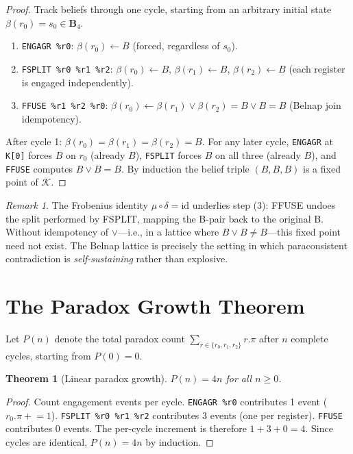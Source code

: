 \documentclass[12pt,a4paper]{article}
\newtheorem{theorem}{Theorem}
\theoremstyle{definition}
\theoremstyle{remark}
\newtheorem{remark}{Remark}
\begin{document}
\begin{proof}
Track beliefs through one cycle, starting from an arbitrary initial state
$\beta(r_0) = s_0 \in \mathbf{B}_4$.

\begin{enumerate}
  \item \texttt{ENGAGR \%r0}: $\beta(r_0) \leftarrow B$ (forced,
        regardless of $s_0$).
  \item \texttt{FSPLIT \%r0 \%r1 \%r2}: $\beta(r_0) \leftarrow B$,
        $\beta(r_1) \leftarrow B$, $\beta(r_2) \leftarrow B$ (each register
        is engaged independently).
  \item \texttt{FFUSE \%r1 \%r2 \%r0}: $\beta(r_0) \leftarrow \beta(r_1)
        \vee \beta(r_2) = B \vee B = B$ (Belnap join idempotency).
\end{enumerate}

After cycle 1: $\beta(r_0) = \beta(r_1) = \beta(r_2) = B$.  For any later
cycle, \texttt{ENGAGR} at \texttt{K[0]} forces $B$ on $r_0$ (already $B$),
\texttt{FSPLIT} forces $B$ on all three (already $B$), and \texttt{FFUSE}
computes $B \vee B = B$.  By induction the belief triple $(B, B, B)$ is a
fixed point of $\mathcal{K}$.
\end{proof}

\begin{remark}
The Frobenius identity $\mu \circ \delta = \mathrm{id}$ underlies step (3):
FFUSE undoes the split performed by FSPLIT, mapping the B-pair back to the
original B.  Without idempotency of $\vee$---i.e., in a lattice where $B
\vee B \neq B$---this fixed point need not exist.  The Belnap lattice is
precisely the setting in which paraconsistent contradiction is
\emph{self-sustaining} rather than explosive.
\end{remark}

\section{The Paradox Growth Theorem}

Let $P(n)$ denote the total paradox count
$\sum_{r \in \{r_0,r_1,r_2\}} r.\pi$ after $n$ complete cycles, starting
from $P(0) = 0$.

\begin{theorem}[Linear paradox growth]
\label{thm:paradox}
$P(n) = 4n$ for all $n \geq 0$.
\end{theorem}

\begin{proof}
Count engagement events per cycle.
\texttt{ENGAGR \%r0} contributes 1 event ($r_0.\pi \mathrel{+}= 1$).
\texttt{FSPLIT \%r0 \%r1 \%r2} contributes 3 events (one per register).
\texttt{FFUSE} contributes 0 events.
The per-cycle increment is therefore $1 + 3 + 0 = 4$.  Since cycles are
identical, $P(n) = 4n$ by induction.
\end{proof}
\end{document}
